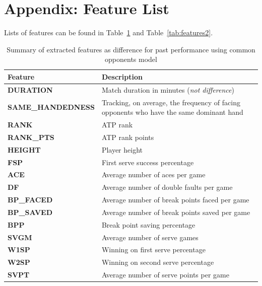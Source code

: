 \documentclass[paper=a4, fontsize=11pt]{scrartcl} %
\numberwithin{equation}{section} %
\numberwithin{figure}{section} %
\numberwithin{table}{section} %
\begin{document}
\section{Appendix: Feature List}
\label{sec:feat}
Lists of features can be found in Table~\ref{tab:features} and Table~\ref{tab:features2}. 

\begin{center}
\begin{table}[h]
    \begin{tabular}{  l | p{10cm} }
    \hline
    Feature  & Description \\ \hline
    \textbf{DURATION}  & Match duration in minutes (\textit{not difference}) \\ \hline
    \textbf{SAME\_HANDEDNESS}  & Tracking, on average, the frequency of facing opponents who have the same dominant hand \\ \hline
    \textbf{RANK}  & ATP rank \\ \hline
    \textbf{RANK\_PTS}  & ATP rank points \\ \hline
    \textbf{HEIGHT}  & Player height \\ \hline
    \textbf{FSP}  & First serve success percentage \\ \hline
    \textbf{ACE}  & Average number of aces per game \\ \hline
    \textbf{DF}  & Average number of double faults per game \\ \hline
    \textbf{BP\_FACED}  & Average number of break points faced per game \\ \hline
    \textbf{BP\_SAVED}  & Average number of break points saved per game \\ \hline
    \textbf{BPP}  & Break point saving percentage \\ \hline
    \textbf{SVGM}  & Average number of serve games \\ \hline
    \textbf{W1SP}  & Winning on first serve percentage \\ \hline
    \textbf{W2SP}  & Winning on second serve percentage \\ \hline
    \textbf{SVPT}  & Average number of serve points per game \\ \hline
    \end{tabular}
    \caption{Summary of extracted features as difference for past performance using common opponents model}
    \label{tab:features}
    \end{table}
\end{center}
\end{document}
